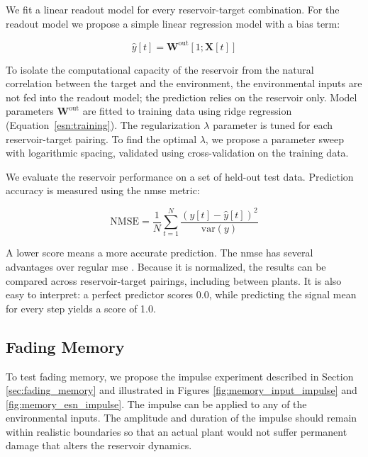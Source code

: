 We fit a linear readout model for every reservoir-target combination.
For the readout model we propose a simple linear regression model with a bias term:

\begin{equation}
\hat{y}[t] = \mathbf{W}^{\text{out}}\left[1;\mathbf{X}[t] \right] \label{methods:readout}
\end{equation}

To isolate the computational capacity of the reservoir from the natural correlation between the target and the environment, the environmental inputs are not fed into the readout model; the prediction relies on the reservoir only.
Model parameters \(\mathbf{W}^{\text{out}}\) are fitted to training data using ridge regression (\mbox{Equation \ref{esn:training}}).
The regularization \(\lambda\) parameter is tuned for each reservoir-target pairing. 
To find the optimal \(\lambda\), we propose a parameter sweep with logarithmic spacing, validated using cross-validation on the training data.

We evaluate the reservoir performance on a set of held-out test data. 
Prediction accuracy is measured using the \acrfull{nmse} metric:

\begin{equation}
\text{NMSE} = \frac{1}{N} \sum_{t=1}^{N} \frac{\left(y[t] - \hat{y}[t]\right)^{2}}{\text{var}(y)} \label{methods:regression_nmse}
\end{equation}

A lower score means a more accurate prediction.
The \acrshort{nmse} has several advantages over regular \acrshort{mse} \citep{pieters_reservoir_2022}.
Because it is normalized, the results can be compared across reservoir-target pairings, including between plants.
It is also easy to interpret: a perfect predictor scores 0.0, while predicting the signal mean for every step yields a score of 1.0.


\subsection{Fading Memory}

To test fading memory, we propose the impulse experiment described in Section \ref{sec:fading_memory} and illustrated in Figures \ref{fig:memory_input_impulse} and \ref{fig:memory_esn_impulse}.
The impulse can be applied to any of the environmental inputs.
The amplitude and duration of the impulse should remain within realistic boundaries so that an actual plant would not suffer permanent damage that alters the reservoir dynamics.


